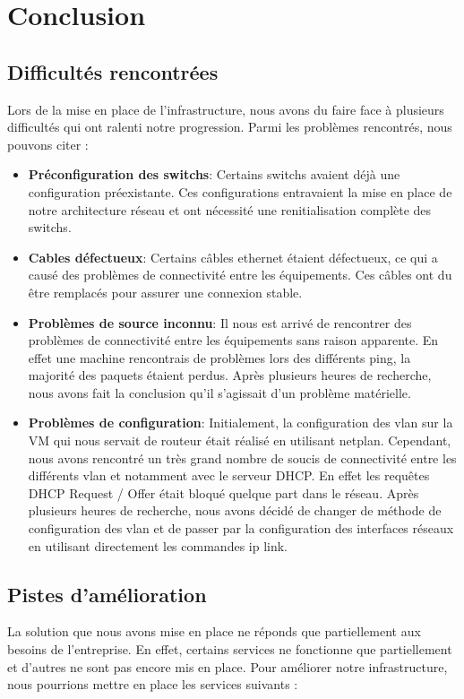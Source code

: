 \documentclass[a4paper,12pt,openany]{report}
\begin{document}
    \chapter{Conclusion}
        \section{Difficultés rencontrées}

            Lors de la mise en place de l'infrastructure, nous avons du faire face à plusieurs difficultés qui ont ralenti notre progression. Parmi les problèmes rencontrés, nous pouvons citer :

            \begin{itemize}
                \item \textbf{Préconfiguration des switchs}: Certains switchs avaient déjà une configuration préexistante. Ces configurations entravaient la mise en place de notre architecture réseau et ont nécessité une renitialisation complète des switchs.
                \item \textbf{Cables défectueux}: Certains câbles ethernet étaient défectueux, ce qui a causé des problèmes de connectivité entre les équipements. Ces câbles ont du être remplacés pour assurer une connexion stable.
                \item \textbf{Problèmes de source inconnu}: Il nous est arrivé de rencontrer des problèmes de connectivité entre les équipements sans raison apparente. En effet une machine rencontrais de problèmes lors des différents ping, la majorité des paquets étaient perdus. Après plusieurs heures de recherche, nous avons fait la conclusion qu'il s'agissait d'un problème matérielle.
                \item \textbf{Problèmes de configuration}: Initialement, la configuration des vlan sur la VM qui nous servait de routeur était réalisé en utilisant netplan. Cependant, nous avons rencontré un très grand nombre de soucis de connectivité entre les différents vlan et notamment avec le serveur DHCP. En effet les requêtes DHCP Request / Offer était bloqué quelque part dans le réseau. Après plusieurs heures de recherche, nous avons décidé de changer de méthode de configuration des vlan et de passer par la configuration des interfaces réseaux en utilisant directement les commandes ip link. 
            \end{itemize}

        \section{Pistes d'amélioration}
            La solution que nous avons mise en place ne réponds que partiellement aux besoins de l'entreprise. En effet, certains services ne fonctionne que partiellement et d'autres ne sont pas encore mis en place. Pour améliorer notre infrastructure, nous pourrions mettre en place les services suivants :
\end{document}
